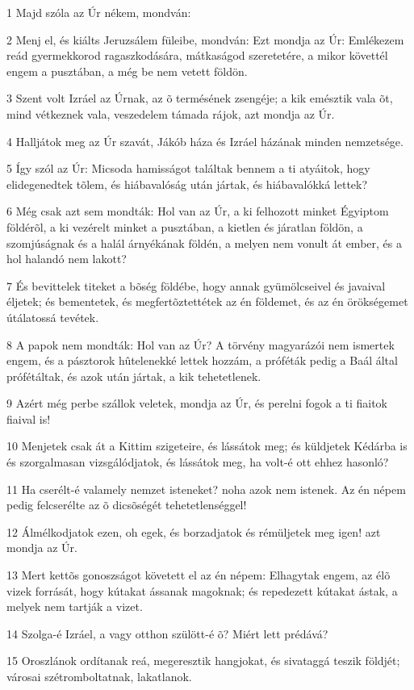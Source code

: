 \par 1 Majd szóla az Úr nékem, mondván:
\par 2 Menj el, és kiálts Jeruzsálem füleibe, mondván: Ezt mondja az Úr: Emlékezem reád gyermekkorod ragaszkodására, mátkaságod szeretetére, a mikor követtél engem a pusztában, a még be nem vetett földön.
\par 3 Szent volt Izráel az Úrnak, az õ termésének zsengéje; a kik emésztik vala õt, mind vétkeznek vala, veszedelem támada rájok, azt mondja az Úr.
\par 4 Halljátok meg az Úr szavát, Jákób háza és Izráel házának minden nemzetsége.
\par 5 Így szól az Úr: Micsoda hamisságot találtak bennem a ti atyáitok, hogy elidegenedtek tõlem, és hiábavalóság után jártak, és hiábavalókká lettek?
\par 6 Még csak azt sem mondták: Hol van az Úr, a ki felhozott minket Égyiptom földérõl, a ki vezérelt minket a pusztában, a kietlen és járatlan földön, a szomjúságnak és a halál árnyékának földén, a melyen nem vonult át ember, és a hol halandó nem lakott?
\par 7 És bevittelek titeket a bõség földébe, hogy annak gyümölcseivel és javaival éljetek; és bementetek, és megfertõztettétek az én földemet, és az én örökségemet útálatossá tevétek.
\par 8 A papok nem mondták: Hol van az Úr? A törvény magyarázói nem ismertek engem, és a pásztorok hûtelenekké lettek hozzám, a próféták pedig a Baál által prófétáltak, és azok után jártak, a kik tehetetlenek.
\par 9 Azért még perbe szállok veletek, mondja az Úr, és perelni fogok a ti fiaitok fiaival is!
\par 10 Menjetek csak át a Kittim szigeteire, és lássátok meg; és küldjetek Kédárba is és szorgalmasan vizsgálódjatok, és lássátok meg, ha volt-é ott ehhez hasonló?
\par 11 Ha cserélt-é valamely nemzet isteneket? noha azok nem istenek. Az én népem pedig felcserélte az õ dicsõségét tehetetlenséggel!
\par 12 Álmélkodjatok ezen, oh egek, és borzadjatok és rémüljetek meg igen! azt mondja az Úr.
\par 13 Mert kettõs gonoszságot követett el az én népem: Elhagytak engem, az élõ vizek forrását, hogy kútakat ássanak magoknak; és repedezett kútakat ástak, a melyek nem tartják a vizet.
\par 14 Szolga-é Izráel, a vagy otthon szülött-é õ? Miért lett prédává?
\par 15 Oroszlánok ordítanak reá, megeresztik hangjokat, és sivataggá teszik földjét; városai szétromboltatnak, lakatlanok.
